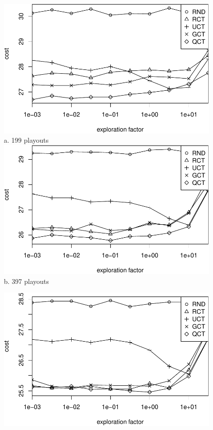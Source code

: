 \documentclass{article}
\begin{document}
\begin{figure}[t]
  \begin{minipage}[b]{0.5\linewidth}
    \centering
    \includegraphics[scale=0.45]{costs-size=6-nsamples=199.pdf}\\
    a. 199 playouts\\
    \vspace{1em}
    \includegraphics[scale=0.45]{costs-size=6-nsamples=397.pdf}\\
    b. 397 playouts\\
  \end{minipage}
  \begin{minipage}[b]{0.5\linewidth}
    \centering
    \includegraphics[scale=0.45]{costs-size=6-nsamples=793.pdf}\\

\end{minipage}
\end{figure}
\end{document}
